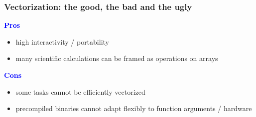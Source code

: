 \documentclass[
    xcolor={svgnames,dvipsnames},
    hyperref={colorlinks, citecolor=DeepPink4, linkcolor=DarkRed, urlcolor=DarkBlue}
    ]{beamer}  %
\newcommand{\navy}[1]{\textcolor{Blue}{\bf #1}}
\newcommand{\1}{\mathbbm 1}
\begin{document}
\begin{frame}

    \begin{figure}
       \begin{center} %
       \end{center}
    \end{figure}


\end{frame}


\begin{frame}
    \frametitle{Vectorization: the good, the bad and the ugly}

    \navy{Pros}

    \begin{itemize}
        \item high interactivity / portability 
        \vspace{0.2em}
        \item many scientific calculations can be framed as operations on arrays
    \end{itemize}

    \vspace{0.5em}
    \vspace{0.5em}

    \navy{Cons}

    \begin{itemize}
        \item some tasks cannot be efficiently vectorized
        \vspace{0.2em}
        \item precompiled binaries cannot adapt flexibly to function arguments /
            hardware
    \end{itemize}


\end{frame}
\end{document}
